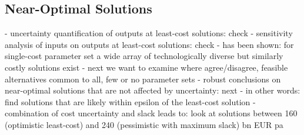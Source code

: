 \subsection{Near-Optimal Solutions}

- uncertainty quantification of outputs at least-cost solutions: check
- sensitivity analysis of inputs on outputs at least-cost solutions: check
- has been shown: for single-cost parameter set a wide array of technologically diverse but similarly costly solutions exist
- next we want to examine where agree/disagree, feasible alternatives common to all, few or no parameter sets
- robust conclusions on near-optimal solutions that are not affected by uncertainty: next
- in other words: find solutions that are likely within epsilon of the least-cost solution
- combination of cost uncertainty and slack leads to: look at solutions between 160 (optimistic least-cost) and 240 (pessimistic with maximum slack) bn EUR pa


